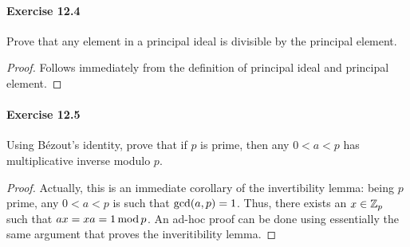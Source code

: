 \paragraph{Exercise 12.4}
Prove that any element in a principal ideal is divisible by the principal element.

\begin{proof}  
Follows immediately from the definition of principal ideal and principal element.
\end{proof}


\paragraph{Exercise 12.5}
Using B\'ezout's identity, prove that if $p$ is prime, then any $0 < a <p$ has
multiplicative inverse modulo $p$.

\begin{proof}  
Actually, this is an immediate corollary of the invertibility lemma: being $p$ 
prime, any $0 < a < p$ is such that $\textrm{gcd}(a, p) = 1$. Thus, there exists an $x \in
\mathbb{Z}_{p}$ such that $a x = x a = 1 \, \mathrm{mod} \, p$. An ad-hoc proof can be done
using essentially the same argument that proves the inveritibility lemma. 
\end{proof}
